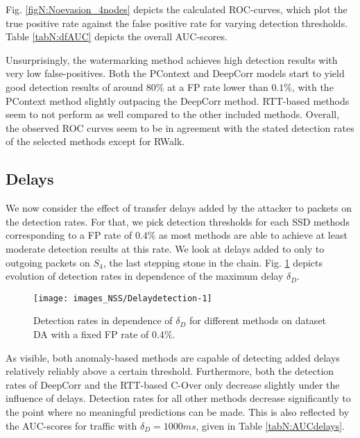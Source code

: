 Fig. \ref{figN:Noevasion_4nodes} depicts the calculated ROC-curves, which plot the true positive rate against the false positive rate for varying detection thresholds. Table \ref{tabN:dfAUC} depicts the overall AUC-scores.



Unsurprisingly, the watermarking method achieves high detection results with very low false-positives. Both the PContext and DeepCorr models start to yield good detection results of around $80\%$ at a FP rate lower than $0.1\%$, with the PContext method slightly outpacing the DeepCorr method. 
RTT-based methods seem to not perform as well compared to the other included methods. Overall, the observed ROC curves seem to be in agreement with the stated detection rates of the selected methods except for RWalk. %




\subsection{Delays}

We now consider the effect of transfer delays added by the attacker to packets on the detection rates. For that, we pick detection thresholds for each SSD methods corresponding to a FP rate of $0.4\%$ as most methods are able to achieve at least moderate detection results at this rate. 
We look at delays added to only to outgoing packets on $S_4$, the last stepping stone in the chain. Fig. \ref{figN:Delaydetection} depicts evolution of detection rates in dependence of the maximum delay $\delta_D$.

\begin{figure}
\texttt{[image: images\_NSS/Delaydetection-1]} \caption[Detection rates in dependence of $\delta_D$ for different methods on dataset DA with a fixed FP rate of $0.4\%$]{Detection rates in dependence of $\delta_D$ for different methods on dataset DA with a fixed FP rate of $0.4\%$.}\label{figN:Delaydetection}
\end{figure}


As visible, both anomaly-based methods are capable of detecting added delays relatively reliably above a certain threshold. Furthermore, both the detection rates of DeepCorr and the RTT-based C-Over only decrease slightly under the influence of delays. Detection rates for all other methods decrease significantly to the point where no meaningful predictions can be made. This is also reflected by the AUC-scores for traffic with $\delta_D=1000ms$, given in Table \ref{tabN:AUCdelays}.

